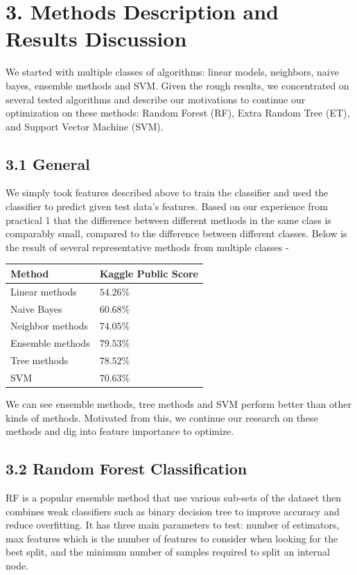 \documentclass[submit]{harvardml}
\begin{document}
\section*{3. Methods Description and Results Discussion}
We started with multiple classes of algorithms: linear models, neighbors, naive bayes, ensemble methods and SVM. Given the rough results, we concentrated on several tested algorithms and describe our motivations to continue our optimization on these methods: Random Forest (RF), Extra Random Tree (ET), and Support Vector Machine (SVM).

\subsection*{3.1 General}

We simply took features described above to train the classifier and used the classifier to predict given test data's features. Based on our experience from practical 1 that the difference between different methods in the same class is comparably small, compared to the difference between different classes. Below is the result of several representative methods from multiple classes -

\begin{center}
  \begin{tabular}{ | l | l | }
    \hline
    Method & Kaggle Public Score \\ \hline
    Linear methods & $54.26\%$ \\ \hline
    Naive Bayes & $60.68\%$ \\ \hline
    Neighbor methods & $74.05\%$ \\ \hline
    Ensemble methods &  $79.53\%$ \\ \hline
    Tree methods & $78.52\%$ \\ \hline        
    SVM & $70.63\%$ \\ \hline               
  \end{tabular}
\end{center}

We can see ensemble methods, tree methods and SVM perform better than other kinds of methods. Motivated from this, we continue our research on these methods and dig into feature importance to optimize.

\subsection*{3.2 Random Forest Classification}
RF is a popular ensemble method that use various sub-sets of the dataset then combines weak classifiers such as binary decision tree to improve accuracy and reduce overfitting. It has three main parameters to test: number of estimators, max features which is the number of features to consider when looking for the best split, and the minimum number of samples required to split an internal node.  
\end{document}
